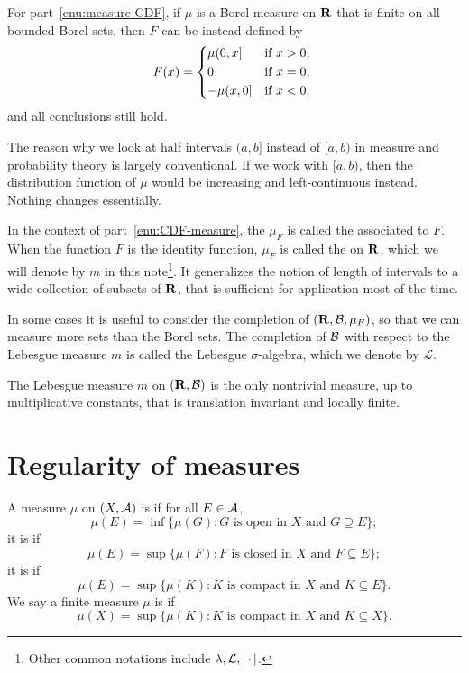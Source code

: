     For part~\ref{enu:measure-CDF}, if $\mu$ is a Borel measure on $\mathbf{R}$ that is finite on all bounded Borel sets, then $F$ can be instead defined by \[
        F(x) = \begin{cases*}
            \mu (0,x] & if $x > 0$, \\
            0 & if $x = 0$, \\
            -\mu(x,0] & if $x < 0$,
        \end{cases*}
    \] and all conclusions still hold.

    The reason why we look at half intervals $(a,b]$ instead of $[a,b)$ in measure and probability theory is largely conventional. If we work with $[a,b)$, then the distribution function of $\mu$ would be increasing and left-continuous instead. Nothing changes essentially.

    In the context of part~\ref{enu:CDF-measure}, the $\mu_F$ is called the  associated to $F$. When the function $F$ is the identity function, $\mu_F$ is called the  on $\mathbf{R}$, which we will denote by $m$ in this note\footnote{Other common notations include $\lambda,\mathcal L,\lvert \,\cdot\, \rvert$.}. It generalizes the notion of length of intervals to a wide collection of subsets of $\mathbf{R}$, that is sufficient for application most of the time.
    
    In some cases it is useful to consider the completion of $(\mathbf{R},\mathcal{B},\mu_F)$, so that we can measure more sets than the Borel sets. The completion of $\mathcal{B}$ with respect to the Lebesgue measure $m$ is called the Lebesgue $\sigma$-algebra, which we denote by $\mathcal L$. 
    
\begin{thm}
    The Lebesgue measure $m$ on $(\mathbf{R},\mathcal{B})$ is the only nontrivial measure, up to multiplicative constants, that is translation invariant and locally finite.
\end{thm}

\section{Regularity of measures}
\begin{defn}
    A measure $\mu$ on $(X,\mathcal{A})$ is  if for all $E\in \mathcal{A}$, \[
        \mu(E) = \inf\{\mu(G): G\text{ is open in }X \text{ and } G\supseteq E\};
    \] it is  if \[
        \mu(E) = \sup\{\mu(F): F\text{ is closed in }X \text{ and } F\subseteq E\};
    \] it is  if \[
        \mu(E) = \sup\{\mu(K): K\text{ is compact in }X  \text{ and } K\subseteq E\}.\]
    We say a finite measure $\mu$ is  if \[
        \mu(X) = \sup\{\mu(K): K\text{ is compact in }X  \text{ and } K\subseteq X\}.
    \]
\end{defn}

